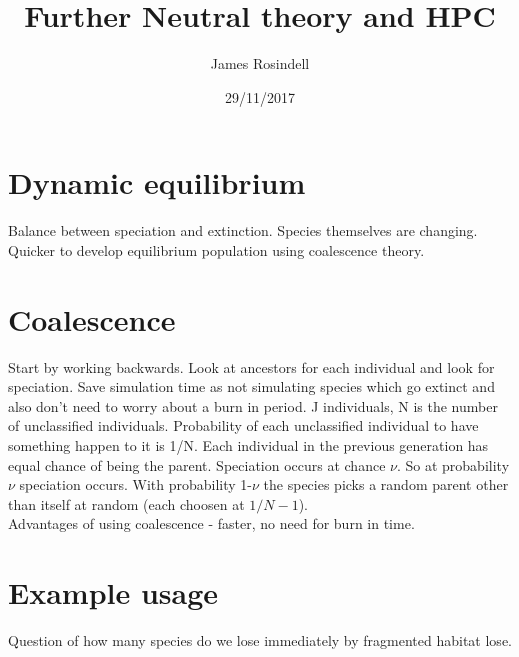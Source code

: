 \documentclass[11pt]{article}
\title{Further Neutral theory and HPC}
\author{James Rosindell}
\date{29/11/2017}
\begin{document}
\maketitle
\section{Dynamic equilibrium}
Balance between speciation and extinction. Species themselves are changing. Quicker to develop equilibrium population using coalescence theory. 
\section{Coalescence}
Start by working backwards. Look at ancestors for each individual and look for speciation. Save simulation time as not simulating species which go extinct and also don't need to worry about a burn in period. J individuals, N is the number of unclassified individuals. Probability of each unclassified individual to have something happen to it is 1/N. Each individual in the previous generation has equal chance of being the parent. Speciation occurs at chance $\nu$. So at probability $\nu$ speciation occurs. With probability 1-$\nu$ the species picks a random parent other than itself at random (each choosen at $1/N-1$).\\
Advantages of using coalescence - faster, no need for burn in time.
\section{Example usage}
Question of how many species do we lose immediately by fragmented habitat lose.  
\end{document}
